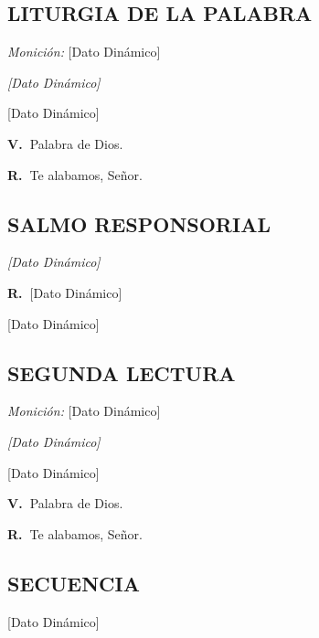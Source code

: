 \documentclass[11pt, letterpaper, twoside]{article}
\newcommand{\rubrica}[1]{\textcolor{rubricred}{\small\textit{#1}}}
\newcommand{\vers}{\textcolor{rubricred}{\textbf{V.\ }}}
\newcommand{\resp}{\textcolor{rubricred}{\textbf{R.\ }}}
\DeclareRobustCommand{\VAR}[1]{[Dato Dinámico]}
\DeclareRobustCommand{\BLOCK}[1]{}
\begin{document}
\begin{multicols}{2}
\BLOCK{ if misa.primera_lectura }
\subsection*{LITURGIA DE LA PALABRA}
\BLOCK{ if misa.monicion_primera_lectura }
\noindent\rubrica{Monición:} \VAR{misa.monicion_primera_lectura | escape_tex} \par\vspace{0.2cm}
\BLOCK{ endif }
\noindent\rubrica{\VAR{misa.primera_lectura.cita | escape_tex}} \par\vspace{0.2cm}
\VAR{misa.primera_lectura.texto | escape_tex | lettrine} \par\vspace{0.2cm}
\vers Palabra de Dios. \par
\resp Te alabamos, Señor.
\BLOCK{ endif }

\BLOCK{ if misa.salmo }
\subsection*{SALMO RESPONSORIAL}
\noindent\rubrica{\VAR{misa.salmo.cita | escape_tex}} \par\vspace{0.1cm}
\resp \VAR{misa.salmo.respuesta | escape_tex} \par\vspace{0.2cm}
\VAR{misa.salmo.texto | escape_tex | lettrine}
\BLOCK{ endif }

\BLOCK{ if misa.segunda_lectura }
\subsection*{SEGUNDA LECTURA}
\BLOCK{ if misa.monicion_segunda_lectura }
\noindent\rubrica{Monición:} \VAR{misa.monicion_segunda_lectura | escape_tex} \par\vspace{0.2cm}
\BLOCK{ endif }
\noindent\rubrica{\VAR{misa.segunda_lectura.cita | escape_tex}} \par\vspace{0.2cm}
\VAR{misa.segunda_lectura.texto | escape_tex | lettrine} \par\vspace{0.2cm}
\vers Palabra de Dios. \par
\resp Te alabamos, Señor.
\BLOCK{ endif }

\BLOCK{ if misa.secuencia }
\subsection*{SECUENCIA}
\VAR{misa.secuencia | escape_tex | lettrine} \par\vspace{0.3cm}
\BLOCK{ endif }


\end{multicols}
\end{document}
